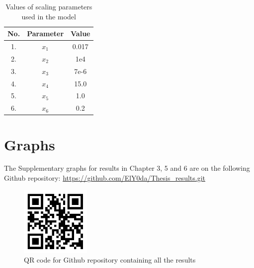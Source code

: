\begin{table}[p]
  \centering
  \begin{tabular}{|c|c|c|}
    \hline
    \textbf{No.} & \textbf{Parameter} & \textbf{Value} \\
    \hline
    1. & $x_{1}$ & 0.017 \\
    \hline
    2. & $x_{2}$ & 1e4 \\
    \hline
    3. & $x_{3}$ & 7e-6 \\
    \hline
    4. & $x_{4}$ & 15.0 \\
    \hline
    5. & $x_{5}$ & 1.0 \\
    \hline
    6. & $x_{6}$ & 0.2 \\
    \hline
  \end{tabular}
  \caption{Values of scaling parameters used in the model}
  \label{tab:scale_param}
\end{table}
\clearpage

\section{Graphs}
\noindent The Supplementary graphs for results in Chapter 3, 5 and 6 are on the following Github repository: \url{https://github.com/ElY0da/Thesis_results.git}
\begin{figure}[h]
  \centering
  \includegraphics[width=0.3\textwidth]{CA1/github_thesis_results}
  \caption{QR code for Github repository containing all the results}
\end{figure}
\clearpage

